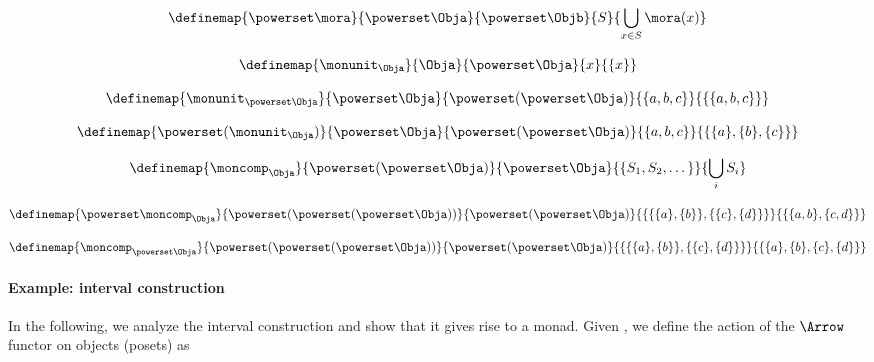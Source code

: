 \begin{equation}\label{eq:monad-power-functor}
  \definemap{
    \powerset \mora
  }{
    \powerset \Obja
  }{
    \powerset \Objb
  }{
    S
  }{
  \bigcup_{x\in S} \mora(x)
  }
\end{equation}

\begin{equation}\label{eq:monad-power-monunit}
  \definemap{
    \monunit_\Obja
  }{
    \Obja
  }{
    \powerset\Obja
  }{
    x
  }{
    \{ x \}
  }
\end{equation}


\begin{equation}\label{eq:monad-power-monunit-power}
  \definemap{
    \monunit_{\powerset \Obja}
  }{
    \powerset \Obja
  }{
    \powerset (\powerset\Obja)
  }{
    \{a, b, c\}
  }{
    \{ \{a, b, c \} \}
  }
\end{equation}


\begin{equation}\label{eq:monad-power-power-monunit}
  \definemap{
    \powerset(\monunit_\Obja)
  }{
    \powerset \Obja
  }{
    \powerset (\powerset\Obja)
  }{
    \{a, b, c\}
  }{
     \{ \{a\}, \{ b\}, \{c\} \}
  }
\end{equation}


\begin{equation}\label{eq:monad-power-moncomp}
  \definemap{
    \moncomp_{\Obja}
  }{
    \powerset (\powerset\Obja)
  }{
    \powerset \Obja
  }{
    \{S_1, S_2, \dots \}
  }{
     \bigcup_i  S_i
  }
\end{equation}


\begin{equation}\label{eq:monad-power-power-moncomp}
  \definemap{
    \powerset \moncomp_{\Obja}
  }{
    \powerset (\powerset (\powerset\Obja))
  }{
    \powerset (\powerset \Obja)
  }{
    \{  \{   \{a\}, \{b\} \} , \{ \{c\}, \{d\} \}\}
  }{
     \{  \{ a, b \}, \{ c, d \} \}
  }
\end{equation}


\begin{equation}\label{eq:monad-power-moncomp-power}
  \definemap{
    \moncomp_{\powerset \Obja}
  }{
    \powerset (\powerset (\powerset\Obja))
  }{
    \powerset (\powerset \Obja)
  }{
    \{  \{   \{a\}, \{b\} \} , \{ \{c\}, \{d\} \}\}
  }{
    \{    \{a\}, \{b\}  ,  \{c\}, \{d\}  \}
  }
\end{equation}


\paragraph*{Example: interval construction}
In the following, we analyze the interval construction and show that it gives rise to a monad.
Given \Pos, we define the action of the $\Arrow$ functor on objects (posets) as

